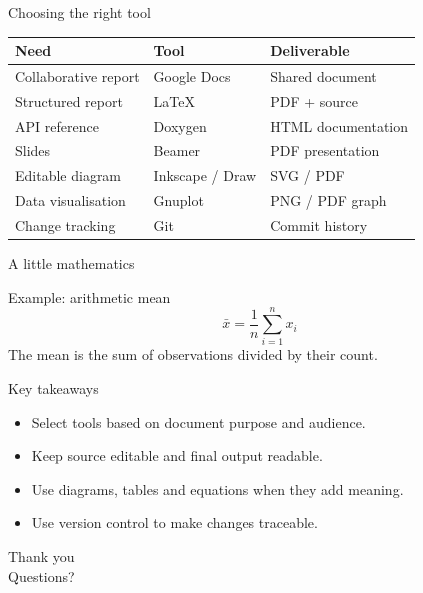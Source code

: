 \documentclass[aspectratio=169,11pt]{beamer}
\begin{document}
\begin{frame}{Choosing the right tool}\small
\begin{tabular}{lll}\toprule\textbf{Need}&\textbf{Tool}&\textbf{Deliverable}\\\midrule
Collaborative report&Google Docs&Shared document\\
Structured report&LaTeX&PDF + source\\
API reference&Doxygen&HTML documentation\\
Slides&Beamer&PDF presentation\\
Editable diagram&Inkscape / Draw&SVG / PDF\\
Data visualisation&Gnuplot&PNG / PDF graph\\
Change tracking&Git&Commit history\\\bottomrule
\end{tabular}
\end{frame}
\begin{frame}{A little mathematics}
\begin{block}{Example: arithmetic mean}
\[\bar{x}=\frac{1}{n}\sum_{i=1}^{n}x_i\]
The mean is the sum of observations divided by their count.
\end{block}
\end{frame}
\begin{frame}{Key takeaways}
\begin{itemize}
\item Select tools based on document purpose and audience.
\item Keep source editable and final output readable.
\item Use diagrams, tables and equations when they add meaning.
\item Use version control to make changes traceable.
\end{itemize}
\end{frame}
\begin{frame}{Thank you}\\[0.5cm]{\large Questions?}\end{frame}
\end{document}
